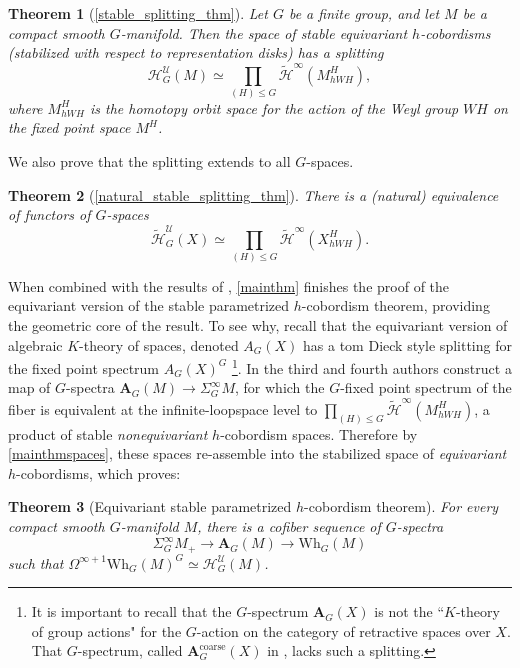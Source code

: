 \documentclass[11pt]{amsart}
\newtheorem{thm}{Theorem}[section]
\theoremstyle{definition}
\numberwithin{equation}{section}
\numberwithin{figure}{section}
\newcommand{\mc}{\mathcal}
\newcommand{\Wh}{\mathrm{Wh}}
\newcommand{\A}{\textbf{A}}
\begin{document}
 \begin{thm}[\autoref{stable_splitting_thm}]\label{mainthm}
 Let $G$ be a finite group, and let $M$ be a compact smooth $G$-manifold.  Then the space of stable equivariant $h$-cobordisms (stabilized with respect to representation disks) has a splitting
 $$\mathcal{H}_G^\mathcal{U}(M)\simeq \prod_{(H) \leq G} \widetilde{\mc H}^\infty(M^H_{hWH} ),$$ where $M^H_{hWH}$ is the homotopy orbit space for the action of  the Weyl group $WH$ on the fixed point space $M^H$.
 \end{thm}
\noindent
We also prove that the splitting extends to all $G$-spaces.
\begin{thm}[\autoref{natural_stable_splitting_thm}]\label{mainthmspaces}
	There is a (natural) equivalence of functors of $G$-spaces
	$$\widetilde{\mc H}_G^\mathcal{U}(X)\simeq \prod_{(H) \leq G} \widetilde{\mc H}^\infty(X^H_{hWH} ).$$
\end{thm}

When combined with the results of \cite{CaryMona,CaryMona3}, \autoref{mainthm} finishes the proof of the equivariant version of the stable parametrized $h$-cobordism theorem, providing the geometric core of the result. To see why, recall that the equivariant version of algebraic $K$-theory of spaces, denoted $A_G(X)$ has a tom Dieck style splitting for the fixed point spectrum $A_G(X)^G$  \cite{CaryMona}\footnote{It is important to recall that the $G$-spectrum $\A_G(X)$ is not the ``$K$-theory of group actions" for the $G$-action on the category of retractive spaces over $X$. That $G$-spectrum, called $\A_G^\mathrm{coarse}(X)$ in \cite{malkiewich_merling_coassembly}, lacks such a splitting.}. In \cite{CaryMona3} the third and fourth authors construct a map of $G$-spectra $\A_G(M)\to \Sigma^\infty_G M$, for which the $G$-fixed point spectrum of the fiber is equivalent at the infinite-loopspace level to 
$\prod_{(H) \leq G} \widetilde{\mc H}^\infty(M^H_{hWH})$, a product of stable \emph{nonequivariant} $h$-cobordism spaces. Therefore by \autoref{mainthmspaces}, these spaces re-assemble into the stabilized space of \emph{equivariant} $h$-cobordisms, which proves:

\begin{thm}[Equivariant stable parametrized $h$-cobordism theorem]\label{esphcthm} For every compact smooth $G$-manifold $M$, there is a cofiber sequence of $G$-spectra
$$\Sigma^\infty_{G} M_+ \to \A_G(M)\to \Wh_G(M)$$
such that $\Omega^{\infty+1}  \Wh_G(M)^G \simeq \mathcal{H}_G^\mathcal{U}(M)$.
\end{thm}
\end{document}
